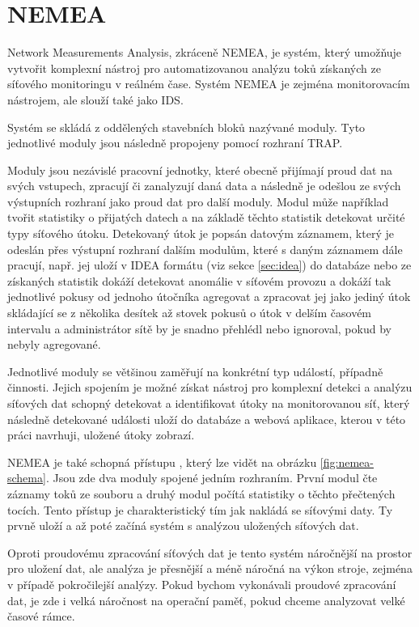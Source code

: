 \section{NEMEA}

Network Measurements Analysis, zkráceně NEMEA, je systém, který umožňuje vytvořit komplexní nástroj pro automatizovanou analýzu toků získaných ze síťového monitoringu v reálném čase. Systém NEMEA je zejména monitorovacím nástrojem, ale slouží také jako IDS.

Systém se skládá z oddělených stavebních bloků nazývané moduly. Tyto jednotlivé moduly jsou následně propojeny pomocí rozhraní TRAP.

Moduly jsou nezávislé pracovní jednotky, které obecně přijímají proud dat na svých vstupech, zpracují či zanalyzují daná data a následně je odešlou ze svých výstupních rozhraní jako proud dat pro další moduly. Modul může například tvořit statistiky o přijatých datech a na základě těchto statistik detekovat určité typy síťového útoku. Detekovaný útok je popsán datovým záznamem, který je odeslán přes výstupní rozhraní dalším modulům, které s daným záznamem dále pracují, např. jej uloží v IDEA formátu (viz sekce \ref{sec:idea}) do databáze nebo ze získaných statistik dokáží detekovat anomálie v síťovém provozu a dokáží tak jednotlivé pokusy od jednoho útočníka agregovat a zpracovat jej jako jediný útok skládající se z několika desítek až stovek pokusů o útok v delším časovém intervalu a administrátor sítě by je snadno přehlédl nebo ignoroval, pokud by nebyly agregované.

Jednotlivé moduly se většinou zaměřují na konkrétní typ událostí, případně činnosti. Jejich spojením je možné získat nástroj pro komplexní detekci a analýzu síťových dat schopný detekovat a identifikovat útoky na monitorovanou síť, který následně detekované události uloží do databáze a webová aplikace, kterou v této práci navrhuji, uložené útoky zobrazí.

NEMEA je také schopná přístupu , který lze vidět na obrázku \ref{fig:nemea-schema}. Jsou zde dva moduly spojené jedním rozhraním. První modul čte záznamy toků ze souboru a druhý modul počítá statistiky o těchto přečtených tocích. Tento přístup je charakteristický tím jak nakládá se síťovými daty. Ty prvně uloží a až poté začíná systém s analýzou uložených síťových dat. 

Oproti proudovému zpracování síťových dat je tento systém náročnější na prostor pro uložení dat, ale analýza je přesnější a méně náročná na výkon stroje, zejména v případě pokročilejší analýzy. Pokud bychom vykonávali proudové zpracování dat, je zde i velká náročnost na operační paměť, pokud chceme analyzovat velké časové rámce.

